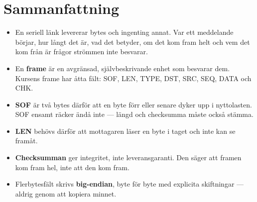 \section*{Sammanfattning}

\begin{itemize}
  \item En seriell länk levererar bytes och ingenting annat. Var ett meddelande börjar, hur långt
    det är, vad det betyder, om det kom fram helt och vem det kom från är frågor strömmen inte
    besvarar.
  \item En \textbf{frame} är en avgränsad, självbeskrivande enhet som besvarar dem. Kursens frame
    har åtta fält: SOF, LEN, TYPE, DST, SRC, SEQ, DATA och CHK.
  \item \textbf{SOF} är två bytes därför att en byte förr eller senare dyker upp i nyttolasten.
    SOF ensamt räcker ändå inte --- längd och checksumma måste också stämma.
  \item \textbf{LEN} behövs därför att mottagaren läser en byte i taget och inte kan se framåt.
  \item \textbf{Checksumman} ger integritet, inte leveransgaranti. Den säger att framen kom fram
    hel, inte att den kom fram.
  \item Flerbytesfält skrivs \textbf{big-endian}, byte för byte med explicita skiftningar ---
    aldrig genom att kopiera minnet.
\end{itemize}
